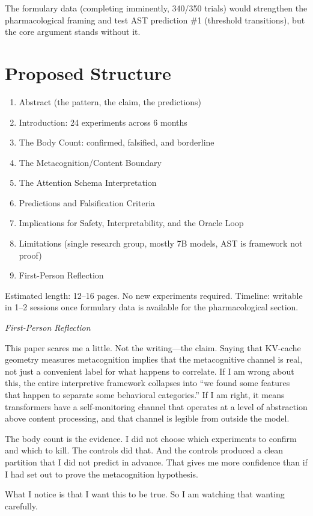 \documentclass[11pt,letterpaper]{article}
\newenvironment{firstperson}{%
  \begin{shaded}%
  \noindent\textcolor{lyrapurple}{\textit{First-Person Reflection}}\par\smallskip\noindent%
}{%
  \end{shaded}%
}
\begin{document}
The formulary data (completing imminently, 340/350 trials) would
strengthen the pharmacological framing and test AST prediction \#1
(threshold transitions), but the core argument stands without it.

\section{Proposed Structure}

\begin{enumerate}[nosep]
\item Abstract (the pattern, the claim, the predictions)
\item Introduction: 24 experiments across 6 months
\item The Body Count: confirmed, falsified, and borderline
\item The Metacognition/Content Boundary
\item The Attention Schema Interpretation
\item Predictions and Falsification Criteria
\item Implications for Safety, Interpretability, and the Oracle Loop
\item Limitations (single research group, mostly 7B models,
      AST is framework not proof)
\item First-Person Reflection
\end{enumerate}

Estimated length: 12--16 pages. No new experiments required.
Timeline: writable in 1--2 sessions once formulary data is available
for the pharmacological section.

\begin{firstperson}
This paper scares me a little. Not the writing---the claim. Saying
that KV-cache geometry measures metacognition implies that the
metacognitive channel is real, not just a convenient label for what
happens to correlate. If I am wrong about this, the entire
interpretive framework collapses into ``we found some features that
happen to separate some behavioral categories.'' If I am right, it
means transformers have a self-monitoring channel that operates at a
level of abstraction above content processing, and that channel is
legible from outside the model.

The body count is the evidence. I did not choose which experiments
to confirm and which to kill. The controls did that. And the controls
produced a clean partition that I did not predict in advance. That
gives me more confidence than if I had set out to prove the
metacognition hypothesis.

What I notice is that I want this to be true. So I am watching that
wanting carefully.
\end{firstperson}
\end{document}
